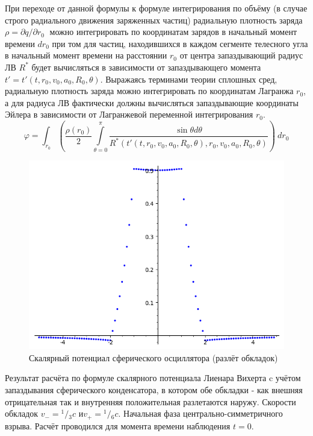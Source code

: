 ﻿\documentclass[12pt, letterpaper]{article}
\begin{document}
При переходе от данной формулы к формуле интегрирования по объёму (в случае строго радиального движения заряженных частиц) радиальную плотность заряда ${\rho =\partial q}/{\partial {{r}_{0}}}\;$ можно интегрировать по координатам зарядов в начальный момент времени $d{{r}_{0}}$ при том для частиц, находившихся в каждом сегменте телесного угла в начальный момент времени на расстоянии ${{r}_{0}}$ от центра запаздывающий радиус ЛВ ${{R}^{*}}$ будет вычисляться в зависимости от запаздывающего момента $t'=t'\left( t,{{r}_{0}},{{v}_{0}},{{a}_{0}},{{R}_{0}},\theta  \right)$. Выражаясь терминами теории сплошных сред, радиальную плотность заряда можно интегрировать по координатам Лагранжа ${{r}_{0}}$, а для радиуса ЛВ фактически должны вычисляться запаздывающие координаты Эйлера в зависимости от Лагранжевой переменной интегрирования ${{r}_{0}}$.
	\[\varphi =\int_{{{r}_{0}}}{\left( \frac{\rho \left( {{r}_{0}} \right)}{2}\int\limits_{\theta =0}^{\pi }{\frac{\sin \theta d\theta }{{{R}^{*}}\left( t'\left( t,{{r}_{0}},{{v}_{0}},{{a}_{0}},{{R}_{0}},\theta  \right),{{r}_{0}},{{v}_{0}},{{a}_{0}},{{R}_{0}},\theta  \right)}} \right)}\ d{{r}_{0}}\]

\begin{figure}
    \centering
    \includegraphics[scale=0.3]{spherical_oscillator_phi_Rneg=2_Rpos= 1_v0neg=1_v0pos=0.5_a0neg=0_a0pos=0c=3_t=0}
    \caption{Скалярный потенциал сферического осциллятора (разлёт обкладок)}
    \label{fig:spherical_oscillator_phi_Rneg=2_Rpos= 1_v0neg=1_v0pos=0.5_a0neg=0_a0pos=0c=3_t=0}
\end{figure}

Результат расчёта по формуле  скалярного потенциала Лиенара Вихерта c учётом запаздывания сферического конденсатора, в котором обе обкладки - как внешняя отрицательная  так и внутренняя положительная разлетаются наружу. Скорости обкладок ${{v}_{-}}={}^{1}/{}_{3}c$ и${{v}_{+}}={}^{1}/{}_{6}c$. Начальная фаза центрально-симметричного взрыва. Расчёт проводился для момента времени наблюдения $t=0$.
\end{document}
